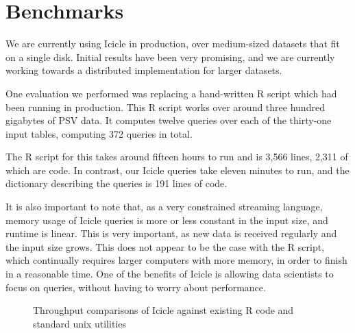 \section{Benchmarks}
\label{s:Benchmarks}

We are currently using Icicle in production, over medium-sized datasets that fit on a single disk.
Initial results have been very promising, and we are currently working towards a distributed implementation for larger datasets.

One evaluation we performed was replacing a hand-written R script which had been running in production.
This R script works over around three hundred gigabytes of PSV data.
It computes twelve queries over each of the thirty-one input tables, computing 372 queries in total.

The R script for this takes around fifteen hours to run and is 3,566 lines, 2,311 of which are code.
In contrast, our Icicle queries take eleven minutes to run, and the dictionary describing the queries is 191 lines of code.

It is also important to note that, as a very constrained streaming language, memory usage of Icicle queries is more or less constant in the input size, and runtime is linear.
This is very important, as new data is received regularly and the input size grows.
This does not appear to be the case with the R script, which continually requires larger computers with more memory, in order to finish in a reasonable time.
One of the benefits of Icicle is allowing data scientists to focus on queries, without having to worry about performance.

\begin{figure}


\caption{Throughput comparisons of Icicle against existing R code and standard unix utilities}
\label{fig:bench:other}
\end{figure}


